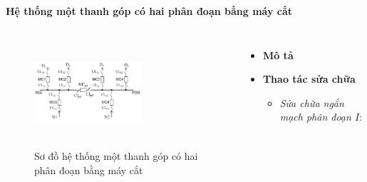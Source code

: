 \documentclass{beamer}
\begin{document}
\begin{frame}{\textbf{Hệ thống một thanh góp có hai phân đoạn bằng máy cắt}}
\begin{columns}
\begin{figure}[h]
\includegraphics[width=4cm, height=4cm]{pdbmc}
\caption{Sơ đồ hệ thống một thanh góp có hai phân đoạn bằng máy cắt}
\end{figure}

\begin{itemize}
\item \textbf{Mô tả}
\item  \textbf{Thao tác sửa chữa}
\begin{itemize}
\item<1-> \emph{Sửa chữa ngắn mạch phân đoạn $I$}: 
\end{itemize}
\end{itemize}
\end{columns}
\end{frame}
\end{document}
